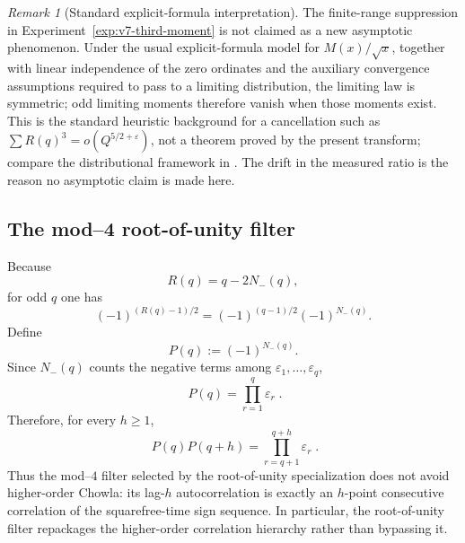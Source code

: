 \documentclass[11pt]{amsart}
\numberwithin{equation}{section}
\theoremstyle{plain}
\theoremstyle{definition}
\theoremstyle{remark}
\newtheorem{remark}[theorem]{Remark}
\begin{document}
\begin{remark}[Standard explicit-formula interpretation]
\label{rem:third-moment-LI}
The finite-range suppression in Experiment~\ref{exp:v7-third-moment} is not
claimed as a new asymptotic phenomenon.  Under the usual explicit-formula model
for $M(x)/\sqrt{x}$, together with linear independence of the zero ordinates and
the auxiliary convergence assumptions required to pass to a limiting
distribution, the limiting law is symmetric; odd limiting moments therefore
vanish when those moments exist.  This is the standard heuristic background for
a cancellation such as $\sum R(q)^3=o(Q^{5/2+\varepsilon})$, not a theorem
proved by the present transform; compare the distributional framework in
\cite{Ng2004}.  The drift in the measured ratio is the reason no asymptotic
claim is made here.
\end{remark}

\subsection{The mod--4 root-of-unity filter}
\label{subsec:mod4-filter}

Because
\begin{equation}
\label{eq:R-q-Nminus}
R(q)=q-2N_-(q),
\end{equation}
for odd $q$ one has
\begin{equation}
\label{eq:mod4-filter-identity}
(-1)^{(R(q)-1)/2}
=(-1)^{(q-1)/2}(-1)^{N_-(q)}.
\end{equation}
Define
\begin{equation}
\label{eq:P-prefix-product}
P(q):=(-1)^{N_-(q)}.
\end{equation}
Since $N_-(q)$ counts the negative terms among
$\varepsilon_1,\ldots,\varepsilon_q$,
\begin{equation}
\label{eq:P-product-epsilon}
\boxed{\;
P(q)=\prod_{r=1}^{q}\varepsilon_r
\;}.
\end{equation}
Therefore, for every $h\ge1$,
\begin{equation}
\label{eq:P-autocorrelation-hpoint}
\boxed{\;
P(q)P(q+h)=\prod_{r=q+1}^{q+h}\varepsilon_r
\;}.
\end{equation}
Thus the mod--$4$ filter selected by the root-of-unity specialization does not
avoid higher-order Chowla: its lag-$h$ autocorrelation is exactly an
$h$-point consecutive correlation of the squarefree-time sign sequence.  In
particular, the root-of-unity filter repackages the higher-order correlation
hierarchy rather than bypassing it.
\end{document}
